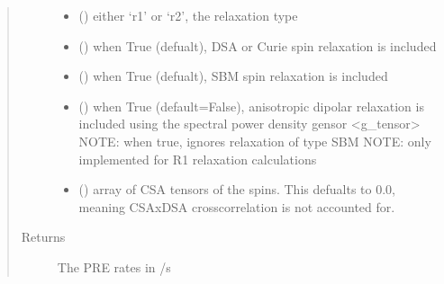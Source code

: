\documentclass[a4paper,10pt,english,openany,oneside]{sphinxmanual}
\begin{document}
\begin{fulllineitems}
\begin{fulllineitems}
\begin{fulllineitems}
\begin{quote}
\begin{description}
\begin{itemize}
\item {} 
 () \textendash{} either ‘r1’ or ‘r2’, the relaxation type

\item {} 
 (\sphinxstyleliteralemphasis{\sphinxupquote{ (}}\sphinxstyleliteralemphasis{\sphinxupquote{)}}) \textendash{} when True (defualt), DSA or Curie spin relaxation is included

\item {} 
 (\sphinxstyleliteralemphasis{\sphinxupquote{ (}}\sphinxstyleliteralemphasis{\sphinxupquote{)}}) \textendash{} when True (defualt), SBM spin relaxation is included

\item {} 
 (\sphinxstyleliteralemphasis{\sphinxupquote{ (}}\sphinxstyleliteralemphasis{\sphinxupquote{)}}) \textendash{} when True (default=False), anisotropic dipolar relaxation is
included using the spectral power density gensor \textless{}g\_tensor\textgreater{}
NOTE: when true, ignores relaxation of type SBM
NOTE: only implemented for R1 relaxation calculations

\item {} 
 (\sphinxstyleliteralemphasis{\sphinxupquote{ (}}\sphinxstyleliteralemphasis{\sphinxupquote{,}}\sphinxstyleliteralemphasis{\sphinxupquote{,}}\sphinxstyleliteralemphasis{\sphinxupquote{) }}\sphinxstyleliteralemphasis{\sphinxupquote{(}}\sphinxstyleliteralemphasis{\sphinxupquote{)}}) \textendash{} array of CSA tensors of the spins.
This defualts to 0.0, meaning CSAxDSA crosscorrelation is
not accounted for.

\end{itemize}

\item[{Returns}] \leavevmode
{} \textendash{} The PRE rates in /s


\end{description}
\end{quote}
\end{fulllineitems}
\end{fulllineitems}
\end{fulllineitems}
\end{document}
